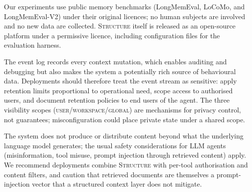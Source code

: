 Our experiments use public memory benchmarks (LongMemEval, LoCoMo,
and LongMemEval-V2) under their original licences; no human subjects
are involved and no new data are collected. \textsc{Structure} itself is
released as an open-source platform under a permissive licence,
including configuration files for the evaluation harness.

The event log records every context mutation, which enables auditing
and debugging but also makes the system a potentially rich source of
behavioural data. Deployments should therefore treat the event stream
as sensitive: apply retention limits proportional to operational need,
scope access to authorised users, and document retention policies to
end users of the agent. The three visibility scopes
(\textsc{user}/\textsc{workspace}/\textsc{global}) are mechanisms for
privacy control, not guarantees; misconfiguration could place
private state under a shared scope.

The system does not produce or distribute content beyond what the
underlying language model generates; the usual safety considerations
for LLM agents (misinformation, tool misuse, prompt injection through
retrieved content) apply. We recommend deployments combine
\textsc{Structure} with per-tool authorisation and content filters,
and caution that retrieved documents are themselves a prompt-injection
vector that a structured context layer does not mitigate.
